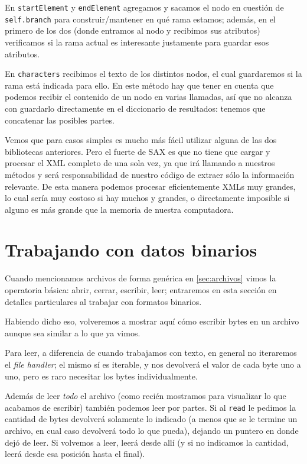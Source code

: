 En \texttt{startElement} y \texttt{endElement} agregamos y sacamos el nodo en cuestión de \texttt{self.branch} para construir/mantener en qué rama estamos; además, en el primero de los dos (donde entramos al nodo y recibimos sus atributos) verificamos si la rama actual es interesante justamente para guardar esos atributos.

En \texttt{characters} recibimos el texto de los distintos nodos, el cual guardaremos si la rama está indicada para ello. En este método hay que tener en cuenta que podemos recibir el contenido de un nodo en varias llamadas, así que no alcanza con guardarlo directamente en el diccionario de resultados: tenemos que concatenar las posibles partes.

Vemos que para casos simples es mucho más fácil utilizar alguna de las dos bibliotecas anteriores. Pero el fuerte de SAX es que no tiene que cargar y procesar el XML completo de una sola vez, ya que irá llamando a nuestros métodos y será responsabilidad de nuestro código de extraer sólo la información relevante. De esta manera podemos procesar eficientemente XMLs muy grandes, lo cual sería muy costoso si hay muchos y grandes, o directamente imposible si alguno es más grande que la memoria de nuestra computadora.


\section{Trabajando con datos binarios}

Cuando mencionamos archivos de forma genérica en \ref{sec:archivos} vimos la operatoria básica: abrir, cerrar, escribir, leer; entraremos en esta sección en detalles particulares al trabajar con formatos binarios.

Habiendo dicho eso, volveremos a mostrar aquí cómo escribir bytes en un archivo aunque sea similar a lo que ya vimos. 


Para leer, a diferencia de cuando trabajamos con texto, en general no iteraremos el \textit{file handler}; el mismo sí es iterable, y nos devolverá el valor de cada byte uno a uno, pero es raro necesitar los bytes individualmente.

Además de leer \textit{todo} el archivo (como recién mostramos para visualizar lo que acabamos de escribir) también podemos leer por partes. Si al \texttt{read} le pedimos la cantidad de bytes devolverá solamente lo indicado (a menos que se le termine un archivo, en cual caso devolverá todo lo que pueda), dejando un puntero en donde dejó de leer. Si volvemos a leer, leerá desde allí (y si no indicamos la cantidad, leerá desde esa posición hasta el final).


